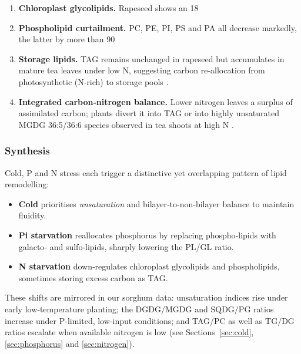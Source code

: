 \documentclass[10pt,letterpaper]{article}
\begin{document}
\begin{enumerate}[label=\textbf{\arabic*.}, leftmargin=1.2em]
  \item \textbf{Chloroplast glycolipids.}  Rapeseed shows an 18 %

  \item \textbf{Phospholipid curtailment.}  PC, PE, PI, PS and PA all decrease markedly, the latter by more than 90 %

  \item \textbf{Storage lipids.}  TAG remains unchanged in rapeseed but accumulates in mature tea leaves under low N, suggesting carbon re‑allocation from photosynthetic (N‑rich) to storage pools \citep[pp.~6--7]{Nitrogen_fertilizer_Ruan}.

  \item \textbf{Integrated carbon‑nitrogen balance.}  Lower nitrogen leaves a surplus of assimilated carbon; plants divert it into TAG or into highly unsaturated MGDG 36:5/36:6 species observed in tea shoots at high N \citep{Nitrogen_fertilizer_Ruan}.
\end{enumerate}

\subsubsection*{Synthesis}

Cold, P and N stress each trigger a distinctive yet overlapping pattern of lipid remodelling:

\begin{itemize}
  \item \textbf{Cold} prioritises \emph{unsaturation} and bilayer‑to‑non‑bilayer balance to maintain fluidity.  
  \item \textbf{Pi starvation} reallocates phosphorus by replacing phospho‑lipids with galacto‑ and sulfo‑lipids, sharply lowering the PL/GL ratio.  
  \item \textbf{N starvation} down‑regulates chloroplast glycolipids and phospholipids, sometimes storing excess carbon as TAG.  
\end{itemize}

These shifts are mirrored in our sorghum data: unsaturation indices rise under early low‑temperature planting; the \(\mathrm{DGDG/MGDG}\) and \(\mathrm{SQDG/PG}\) ratios increase under P‑limited, low‑input conditions; and TAG/PC as well as \(\mathrm{TG/DG}\) ratios escalate when available nitrogen is low (see Sections \ref{sec:cold}, \ref{sec:phosphorus} and \ref{sec:nitrogen}).
\end{document}
